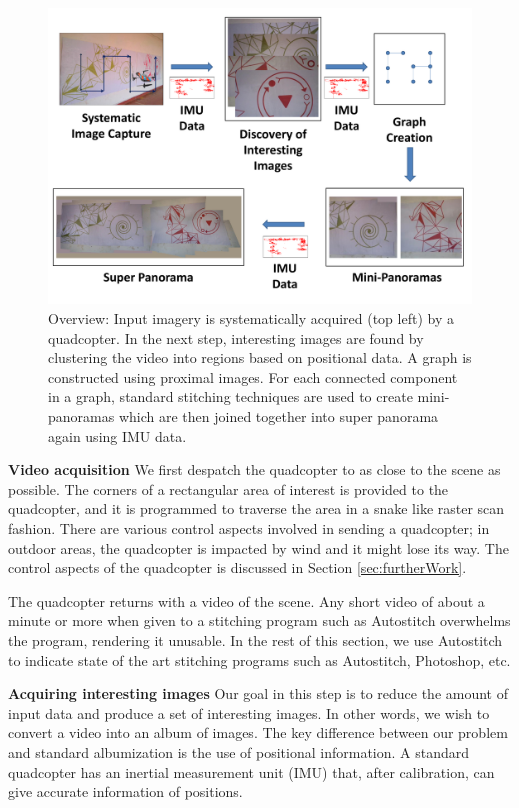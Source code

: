 \documentclass[11pt]{article}
\begin{document}
\begin{figure}[h!]
  \centering
  \includegraphics[width=\textwidth]{mosaicing/figures/Workflow} 
  \caption{ \label{fig:workflow} Overview: Input imagery is
    systematically acquired (top left) by a quadcopter.  In the next
    step, interesting images are found by clustering the video into
    regions based on positional data.  A graph is constructed using
    proximal images. For each connected component in a graph, standard
    stitching techniques are used to create mini-panoramas which are
    then joined together into super panorama 
    again using IMU data.}
\end{figure}    

\noindent\textbf{Video acquisition}
We first despatch the quadcopter to as close to the scene as
possible. The corners of a rectangular area of interest is provided to
the quadcopter, and it is programmed to traverse the area in a snake
like raster scan fashion.  There are various control aspects involved
in sending a quadcopter; in outdoor areas, the quadcopter is impacted
by wind and it might lose its way.  The control aspects of the
quadcopter is discussed in Section \ref{sec:furtherWork}.

The quadcopter returns with a video of the scene.  Any short video of
about a minute or more when given to a stitching program such as
Autostitch overwhelms the program, rendering it unusable. In the rest
of this section, we use Autostitch to indicate state of the art
stitching programs such as Autostitch, Photoshop, etc.

\noindent\textbf{Acquiring interesting images}
\label{sec:selection}
Our goal in this step is to reduce the amount of input data and
produce a set of interesting images.  In other words, we wish to
convert a video into an album of images.  The key difference between
our problem and standard albumization \cite{Aner, Lee} is the use of 
positional information.  A standard quadcopter has an inertial
measurement unit (IMU) that, after calibration, can give accurate
information of positions.
\end{document}
